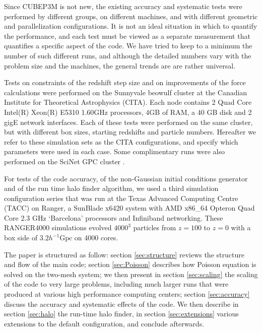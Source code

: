 \documentclass[useAMS,usenatbib]{mn2e}
\begin{document}
Since {\small CUBEP3M} is not new, the existing  accuracy and systematic tests were performed by different groups, on different machines,
and with different geometric and parallelization configurations. It is not an ideal situation in which to quantify the performance, and each test must be viewed as a
separate measurement that quantifies a specific aspect of the code. 
We have tried to keep to a minimum the number of such different runs, and although the detailed numbers vary 
with the problem size and the machines, the general trends are are rather universal.

Tests on constraints of the redshift step size and on improvements of the force calculations were performed 
on the Sunnyvale beowulf cluster at the Canadian Institute for Theoretical Astrophysics (CITA).
Each node contains 2 Quad Core Intel(R) Xeon(R) E5310 1.60GHz processors, 4GB of RAM,  a 40 GB disk and 2 gigE network interfaces. 
Each of these tests were performed on the same cluster, but with  different box sizes, starting redshifts and particle numbers.
Hereafter we refer to these simulation sets as the CITA configurations, and specify which parameters were used in each case.
Some complimentary runs were also performed on the SciNet GPC cluster \citep{Scinet}.

For tests of the code accuracy, of the non-Gaussian initial conditions generator and of the run time halo finder algorithm, 
we used a third simulation configuration series that was run at the Texas Advanced Computing Centre (TACC) on Ranger, a SunBlade 
x6420 system with AMD x86\_64 Opteron Quad Core 2.3 GHz `Barcelona' processors and Infiniband networking.
These RANGER4000 simulations evolved $4000^{3}$ particles 
from $z=100$ to $z=0$ with a box side of $3.2 h^{-1}\mbox{Gpc}$
on 4000 cores.
 

The paper is structured as follow: section \ref{sec:structure} reviews the structure and flow of the main code;
section \ref{sec:Poisson} describes how Poisson equation is solved on the two-mesh system;
we then present in section \ref{sec:scaling} the scaling of the code to very large problems,
including much larger runs that were produced at various high performance computing centers;
section \ref{sec:accuracy}  discuss the accuracy and systematic effects of the code.
 We then describe in section \ref{sec:halo} the run-time halo finder, in section \ref{sec:extensions} various extensions
 to the default configuration, and conclude afterwards.


%
\end{document}
